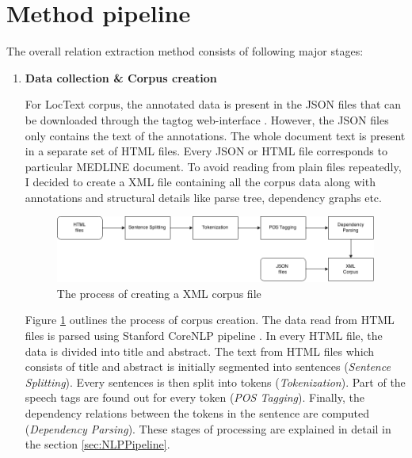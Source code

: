 \section{Method pipeline}\label{sec:pipeline}


The overall relation extraction method consists of following major stages:

\begin{enumerate}

\item \textbf{Data collection \& Corpus creation}

For LocText corpus, the annotated data is present in the JSON files that can be downloaded through the tagtog web-interface \cite{cejuela2014tagtog}. However, the JSON files only contains the text of the annotations. The whole document text is present in a separate set of HTML files. Every JSON or HTML file corresponds to particular MEDLINE \cite{medline} document. To avoid reading from plain files repeatedly, I decided to create a XML file containing all the corpus data along with annotations and structural details like parse tree, dependency graphs etc.

\begin{figure}
\centering
\includegraphics[scale=0.4]{figures/Corpus_Creation.png}
\caption{The process of creating a XML corpus file}\label{fig:corpusCreation}
\end{figure}

Figure \ref{fig:corpusCreation} outlines the process  of corpus creation. The data read from HTML files is parsed using Stanford CoreNLP pipeline \cite{manning2014stanford}. In every HTML file, the data is divided into title and abstract. The text from HTML files which consists of title and abstract is initially segmented into sentences (\textit{Sentence Splitting}). Every sentences is then split into tokens (\textit{Tokenization}). Part of the speech tags are found out for every token (\textit{POS Tagging}). Finally, the dependency relations between the tokens in the sentence are computed (\textit{Dependency Parsing}). These stages of processing are explained in detail in the section \ref{sec:NLPPipeline}.


\end{enumerate}
